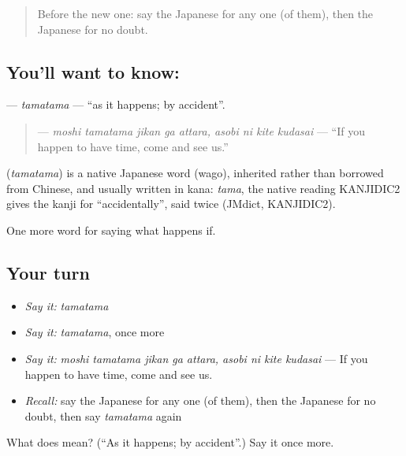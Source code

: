 \begin{quote}
Before the new one: say the Japanese for any one (of them), then the Japanese for no doubt.
\end{quote}

\subsection*{You'll want to know: }
\textbf{} — \emph{tamatama} — \textquotedblleft{}as it happens; by accident\textquotedblright{}.

\begin{quote}
\textbf{     } — \emph{moshi tamatama jikan ga attara, asobi ni kite kudasai} — \textquotedblleft{}If you happen to have time, come and see us.\textquotedblright{}
\end{quote}

\begin{cousinweb}
\textbf{} (\emph{tamatama}) is a native Japanese word (wago), inherited rather than borrowed from Chinese, and usually written in kana: \emph{tama}, the native reading KANJIDIC2 gives the kanji for \textquotedblleft{}accidentally\textquotedblright{}, said twice (JMdict, KANJIDIC2).
\end{cousinweb}

\begin{grammarlens}[title={What you've built}]
One more word for saying what happens if.
\end{grammarlens}

\subsection*{Your turn}
\begin{itemize}
\raggedright
  \item \emph{Say it:} \emph{tamatama}
  \item \emph{Say it:} \emph{tamatama}, once more
  \item \emph{Say it:} \emph{moshi tamatama jikan ga attara, asobi ni kite kudasai} — If you happen to have time, come and see us.
  \item \emph{Recall:} say the Japanese for any one (of them), then the Japanese for no doubt, then say \emph{tamatama} again
\end{itemize}

\begin{tcolorbox}[breakable,colback=teal!4,colframe=teal!35!black,title={Before you move on}]
What does  mean? (\textquotedblleft{}As it happens; by accident\textquotedblright{}.) Say it once more.
\end{tcolorbox}
